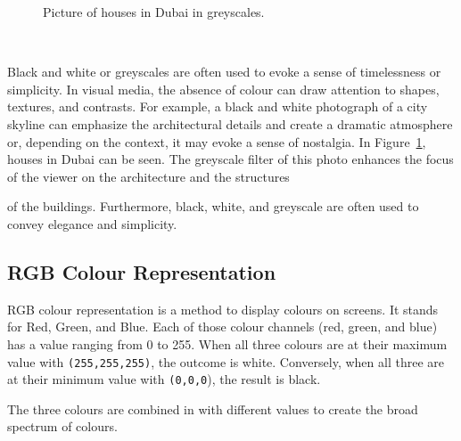 \documentclass[../MasterThesis.tex]{subfiles}
\begin{document}
\begin{minipage}{0.5\textwidth}
	\begin{figure}[H]
	\begin{center}
		\caption[Picture of a houses in Dubai in greyscales.]{Picture of houses in Dubai in greyscales.}
		\label{figure:gray}
	\end{center}
\end{figure}\hfill
\end{minipage}\begin{minipage}{0.05\textwidth}
	\ 
\end{minipage}\begin{minipage}{0.45\textwidth}
	Black and white or greyscales are often used to evoke a sense of timelessness or simplicity. In visual media, the absence of colour can draw attention to shapes, textures, and contrasts. For example, a black and white photograph of a city skyline can emphasize the architectural details and create a dramatic atmosphere or, depending on the context, it may evoke a sense of nostalgia.
	In Figure~\ref{figure:gray}, houses in Dubai can be seen. The greyscale filter of this photo enhances the focus of the viewer on the architecture and the structures

	
\end{minipage}

\vspace*{-0.6em}
 of the buildings. Furthermore, black, white, and greyscale are often used to convey elegance and simplicity.~\cite{colour2}


%





\subsection{RGB Colour Representation}
\label{subsection:RGB}


RGB colour representation is a method to display colours on screens. It stands for Red, Green, and Blue. 
Each of those colour channels (red, green, and blue) has a value ranging from 0 to 255. When all three colours are at their maximum value with \texttt{(255,255,255)}, the outcome is white. Conversely, when all three are at their minimum value with \texttt{(0,0,0}), the result is black.

The three colours are combined in with different values to create the broad spectrum of colours.
\end{document}
